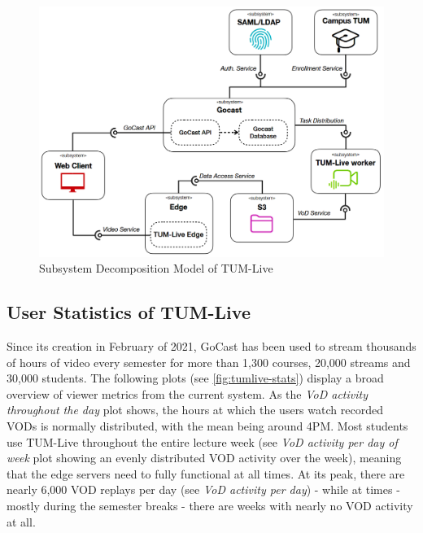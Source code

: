 \begin{figure}[htpb]
    \centering
    \includegraphics[width=420pt]{images/OldDeploymentDiagram2.png}
    \caption[Subsystem Decomposition]{Subsystem Decomposition Model of TUM-Live}\label{fig:old-system-architecture}
\end{figure}

\subsection{User Statistics of TUM-Live}\label{subsection:user-stats-tumlive}

Since its creation in February of 2021, GoCast has been used to stream thousands of hours of video every semester for more than 1,300 courses, 20,000 streams and 30,000 students. The following plots (see \autoref{fig:tumlive-stats}) display a broad overview of viewer metrics from the current system. As the \textit{VoD activity throughout the day} plot shows, the hours at which the users watch recorded \ac{VOD}s is normally distributed, with the mean being around 4PM. Most students use TUM-Live throughout the entire lecture week (see \textit{VoD activity per day of week} plot showing an evenly distributed \ac{VOD} activity over the week), meaning that the edge servers need to fully functional at all times. At its peak, there are nearly 6,000 \ac{VOD} replays per day (see \textit{VoD activity per day}) - while at times - mostly during the semester breaks - there are weeks with nearly no \ac{VOD} activity at all.

